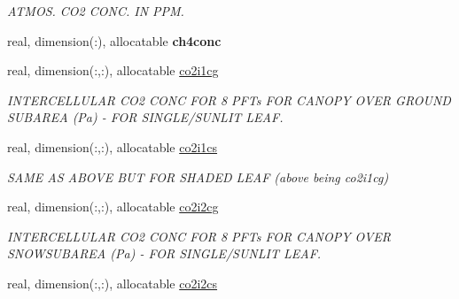 \begin{DoxyCompactItemize}
\begin{DoxyCompactList}\small\item\em A\+T\+M\+O\+S. C\+O2 C\+O\+N\+C. I\+N P\+P\+M. \end{DoxyCompactList}\item 
\hypertarget{structctem__statevars_1_1veg__gat_a58c9eb2d0e44eff8d71e04633e2dc9f8}{}real, dimension(\+:), allocatable {\bfseries ch4conc}\label{structctem__statevars_1_1veg__gat_a58c9eb2d0e44eff8d71e04633e2dc9f8}

\item 
\hypertarget{structctem__statevars_1_1veg__gat_ad39f9033916b32a7c0a8f88adb9f572a}{}real, dimension(\+:,\+:), allocatable \hyperlink{structctem__statevars_1_1veg__gat_ad39f9033916b32a7c0a8f88adb9f572a}{co2i1cg}\label{structctem__statevars_1_1veg__gat_ad39f9033916b32a7c0a8f88adb9f572a}

\begin{DoxyCompactList}\small\item\em I\+N\+T\+E\+R\+C\+E\+L\+L\+U\+L\+A\+R C\+O2 C\+O\+N\+C F\+O\+R 8 P\+F\+Ts F\+O\+R C\+A\+N\+O\+P\+Y O\+V\+E\+R G\+R\+O\+U\+N\+D S\+U\+B\+A\+R\+E\+A (Pa) -\/ F\+O\+R S\+I\+N\+G\+L\+E/\+S\+U\+N\+L\+I\+T L\+E\+A\+F. \end{DoxyCompactList}\item 
\hypertarget{structctem__statevars_1_1veg__gat_afe830c699b0e8e2100cb5bc021280df6}{}real, dimension(\+:,\+:), allocatable \hyperlink{structctem__statevars_1_1veg__gat_afe830c699b0e8e2100cb5bc021280df6}{co2i1cs}\label{structctem__statevars_1_1veg__gat_afe830c699b0e8e2100cb5bc021280df6}

\begin{DoxyCompactList}\small\item\em S\+A\+M\+E A\+S A\+B\+O\+V\+E B\+U\+T F\+O\+R S\+H\+A\+D\+E\+D L\+E\+A\+F (above being co2i1cg) \end{DoxyCompactList}\item 
\hypertarget{structctem__statevars_1_1veg__gat_a6619c71c34b2eadacdc7308c0153bb35}{}real, dimension(\+:,\+:), allocatable \hyperlink{structctem__statevars_1_1veg__gat_a6619c71c34b2eadacdc7308c0153bb35}{co2i2cg}\label{structctem__statevars_1_1veg__gat_a6619c71c34b2eadacdc7308c0153bb35}

\begin{DoxyCompactList}\small\item\em I\+N\+T\+E\+R\+C\+E\+L\+L\+U\+L\+A\+R C\+O2 C\+O\+N\+C F\+O\+R 8 P\+F\+Ts F\+O\+R C\+A\+N\+O\+P\+Y O\+V\+E\+R S\+N\+O\+W\+S\+U\+B\+A\+R\+E\+A (Pa) -\/ F\+O\+R S\+I\+N\+G\+L\+E/\+S\+U\+N\+L\+I\+T L\+E\+A\+F. \end{DoxyCompactList}\item 
\hypertarget{structctem__statevars_1_1veg__gat_a444a9c51751df3c542eed6291dc74439}{}real, dimension(\+:,\+:), allocatable \hyperlink{structctem__statevars_1_1veg__gat_a444a9c51751df3c542eed6291dc74439}{co2i2cs}\label{structctem__statevars_1_1veg__gat_a444a9c51751df3c542eed6291dc74439}


\end{DoxyCompactItemize}
